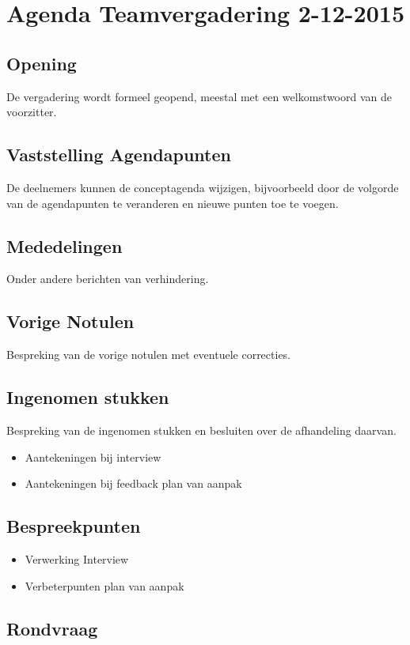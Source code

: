 \documentclass[dutch]{hu}
\date{2 december 2015}
\subtitle{Agenda Teamvergadering \vergaderingDatum}
\def \vergaderingDatum{2-12-2015}
\begin{document}
\maketitle
\pagestyle{plain}
\chapter{Agenda Teamvergadering \vergaderingDatum}
\section{Opening}
De vergadering wordt formeel geopend, meestal met een welkomstwoord van de voorzitter.

\section{Vaststelling Agendapunten}
De deelnemers kunnen de conceptagenda wijzigen, bijvoorbeeld door de volgorde van de agendapunten te veranderen en nieuwe punten toe te voegen.

\section{Mededelingen}
Onder andere berichten van verhindering.

\section{Vorige Notulen}
Bespreking van de vorige notulen met eventuele correcties.

\section{Ingenomen stukken}
Bespreking van de ingenomen stukken en besluiten over de afhandeling daarvan.
\begin{itemize}
\item Aantekeningen bij interview
\item Aantekeningen bij feedback plan van aanpak
\end{itemize}

\section{Bespreekpunten}
\begin{itemize}
\item Verwerking Interview
\item Verbeterpunten plan van aanpak
\end{itemize}

\section{Rondvraag}
\end{document}
